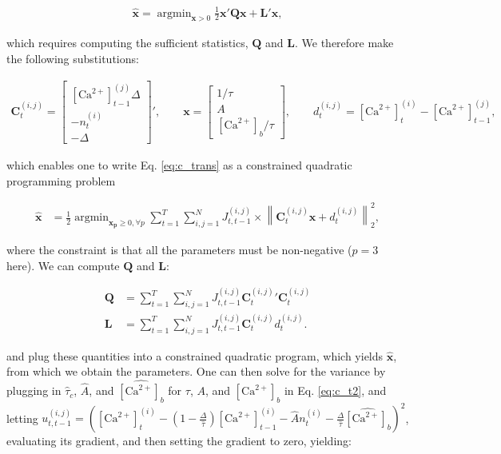 \documentclass[12pt]{article}
\providecommand{\ve}[1]{\boldsymbol{#1}}
\providecommand{\norm}[1]{\left \lVert#1 \right  \rVert}
\providecommand{\ve}[1]{\boldsymbol{#1}}
\DeclareMathOperator*{\argmin}{argmin}
\newcommand{\Ca}{[\text{Ca}^{2+}]}
\begin{document}
\begin{align} \label{eq:quadprog}
\widehat{\ve{x}} = \argmin_{\ve{x} > 0} \frac{1}{2}\ve{x}' \ve{Q} \ve{x} + \ve{L}' \ve{x},
\end{align}

\noindent which requires computing the sufficient statistics, $\ve{Q}$ and $\ve{L}$.  We therefore make the following substitutions:

\begin{align} \label{eq:param_def}
\ve{C}^{(i,j)}_t=
{\begin{bmatrix} \Ca_{t-1}^{(j)} \Delta \\ -n_t^{(i)} \\ -\Delta \end{bmatrix}}',
\qquad \ve{x}= \begin{bmatrix} 1/\tau \\ A \\ \Ca_b/\tau \end{bmatrix},
\qquad d^{(i,j)}_t= \Ca_t^{(i)} -\Ca_{t-1}^{(j)},
\end{align}

\noindent which enables one to write Eq. \ref{eq:c_trans} as a constrained quadratic programming problem

\begin{equation}
\begin{split}
\widehat{\ve{x}} &= \frac{1}{2}  \argmin_{\ve{x_p} \geq 0, \forall p} \sum_{t=1}^T \sum_{i,j=1}^N J^{(i,j)}_{t,t-1} \times \norm{\ve{C}^{(i,j)}_t \ve{x} + d^{(i,j)}_t}_2^2,
\end{split}
\end{equation}

\noindent where the constraint is that all the parameters must be non-negative ($p=3$ here). We can compute $\ve{Q}$ and $\ve{L}$:

\begin{align}
\ve{Q} &= \sum_{t=1}^T \sum_{i,j=1}^N J^{(i,j)}_{t,t-1}  {\ve{C}^{(i,j)}_t}' \ve{C}^{(i,j)}_t\\
\ve{L} &= \sum_{t=1}^T \sum_{i,j=1}^N J^{(i,j)}_{t,t-1} \ve{C}^{(i,j)}_t d^{(i,j)}_t.
\end{align}

\noindent and plug these quantities into a constrained quadratic program, which yields $\widehat{\ve{x}}$, from which we obtain the parameters.  One can then solve for the variance by plugging in $\widehat{\tau}_c$, $\widehat{A}$, and $\widehat{\Ca_b}$  for $\tau$, $A$,  and $\Ca_b$ in Eq. \ref{eq:c_t2}, and letting $u_{t,t-1}^{(i,j)}=\left(\Ca_t^{(i)} - (1 - \frac{\Delta}{\widehat{\tau}}) \Ca_{t-1}^{(i)} - \widehat{A} n_t^{(i)} - \frac{\Delta}{\widehat{\tau}} \widehat{\Ca_b} \right)^2$, evaluating its gradient, and then setting the gradient to zero, yielding:
\end{document}
